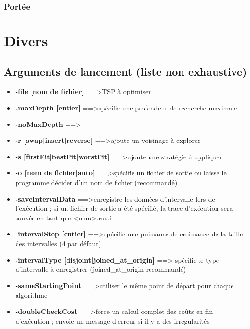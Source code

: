 \documentclass[a4paper,10pt]{report}
\begin{document}
\subsection{Portée}


\chapter{Divers}
\section{Arguments de lancement (liste non exhaustive)}

\begin{itemize}
 \item \textbf{-file [nom de fichier]} ==\textgreater TSP à optimiser
 \item \textbf{-maxDepth [entier]} ==\textgreater spécifie une profondeur de
recherche maximale
 \item \textbf{-noMaxDepth} ==\textgreater 
 \item \textbf{-r [swap|insert|reverse]} ==\textgreater  ajoute un voisinage à
explorer
 \item \textbf{-s [firstFit|bestFit|worstFit]} ==\textgreater ajoute une
stratégie à appliquer
 \item \textbf{-o [nom de fichier|auto]} ==\textgreater spécifie un fichier de
sortie ou laisse le programme décider d'un nom de fichier (recommandé)
 \item \textbf{-saveIntervalData} ==\textgreater enregistre les données
d'intervalle lors de l'exécution ; si un fichier de sortie a été spécifié, la
trace d'exécution sera sauvée en tant que \textless nom\textgreater.csv.i
 \item \textbf{-intervalStep [entier]} ==\textgreater spécifie une puissance de
croissance de la taille des intervalles (4 par défaut)
 \item \textbf{-intervalType [disjoint|joined\_at\_origin]} ==\textgreater
spécifie le type d'intervalle à enregistrer (joined\_at\_origin recommandé)
 \item \textbf{-sameStartingPoint} ==\textgreater utiliser le même point de
départ pour chaque algorithme
 \item \textbf{-doubleCheckCost} ==\textgreater force un calcul complet des
coûts en fin d'exécution ; envoie un message d'erreur si il y a des
irrégularités
\end{itemize}
\end{document}
